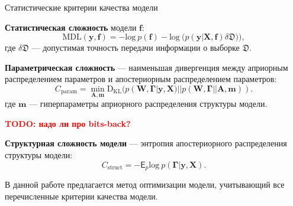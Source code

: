 \documentclass[usenames,dvipsnames,11pt,pdf,utf8,russian,aspectratio=169]{beamer}
\begin{document}
\begin{frame}{Статистические критерии качества модели}
\small

\textbf{Статистическая сложность} модели $\mathbf{f}$:
\[
	\text{MDL}(\mathbf{y},\mathbf{f}) = -\text{log}~p(\mathbf{f}) - \text{log}~\bigl(p(\mathbf{y}|\mathbf{X}, \mathbf{f})\delta\mathfrak{D})\bigr),
\]
где $\delta\mathfrak{D}$ --- допустимая точность передачи информации о выборке $\mathfrak{D}$.


\textbf{Параметрическая сложность} --- наименьшая дивергенция между априорным распределением параметров и апостериорным распределением параметров:
\[
    C_\text{param} = \min_{\mathbf{A}, \mathbf{m}} \text{D}_\text{KL}(p(\mathbf{W}, \boldsymbol{\Gamma}|\mathbf{y}, \mathbf{X})||p(\mathbf{W}, \boldsymbol{\Gamma}||\mathbf{A}, \mathbf{m})).
\]
где $\mathbf{m}$ --- гиперпараметры априорного распределения структуры модели.

\textcolor{red}{\textbf{TODO: надо ли про bits-back?\\}}

\textbf{Структурная сложность модели} --- энтропия апостериорного распределения структуры модели:
\[
    C_\text{struct} = -\mathsf{E}_{p} \text{log}~p(\boldsymbol{\Gamma}|\mathbf{y}, \mathbf{X}).
\]

В данной работе предлагается метод оптимизации модели, учитывающий все перечисленные критерии качества модели. 
\end{frame}
\end{document}
